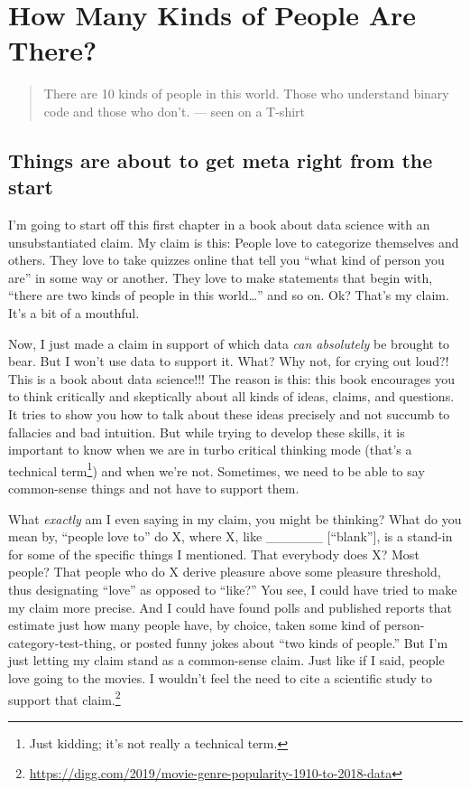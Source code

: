 \documentclass[
  openany]{book}
\begin{document}
\hypertarget{how-many-kinds-of-people-are-there}{%
\chapter*{How Many Kinds of People Are There?}\label{how-many-kinds-of-people-are-there}}

\begin{quote}
There are 10 kinds of people in this world.
Those who understand binary code and those who don't.
--- seen on a T-shirt
\end{quote}

\hypertarget{things-are-about-to-get-meta-right-from-the-start}{%
\section*{Things are about to get meta right from the start}\label{things-are-about-to-get-meta-right-from-the-start}}

I'm going to start off this first chapter in a book about data science with an unsubstantiated claim. My claim is this: People love to categorize themselves and others. They love to take quizzes online that tell you ``what kind of person you are'' in some way or another. They love to make statements that begin with, ``there are two kinds of people in this world\ldots{}'' and so on. Ok? That's my claim. It's a bit of a mouthful.

Now, I just made a claim in support of which data \emph{can absolutely} be brought to bear. But I won't use data to support it. What? Why not, for crying out loud?! This is a book about data science!!! The reason is this: this book encourages you to think critically and skeptically about all kinds of ideas, claims, and questions. It tries to show you how to talk about these ideas precisely and not succumb to fallacies and bad intuition. But while trying to develop these skills, it is important to know when we are in turbo critical thinking mode (that's a technical term\footnote{Just kidding; it's not really a technical term.}) and when we're not. Sometimes, we need to be able to say common-sense things and not have to support them.

What \emph{exactly} am I even saying in my claim, you might be thinking? What do you mean by, ``people love to'' do X, where X, like \_\_\_\_\_\_ {[}``blank''{]}, is a stand-in for some of the specific things I mentioned. That everybody does X? Most people? That people who do X derive pleasure above some pleasure threshold, thus designating ``love'' as opposed to ``like?'' You see, I could have tried to make my claim more precise. And I could have found polls and published reports that estimate just how many people have, by choice, taken some kind of person-category-test-thing, or posted funny jokes about ``two kinds of people.'' But I'm just letting my claim stand as a common-sense claim. Just like if I said, people love going to the movies. I wouldn't feel the need to cite a scientific study to support that claim.\footnote{\url{https://digg.com/2019/movie-genre-popularity-1910-to-2018-data}}
\end{document}
